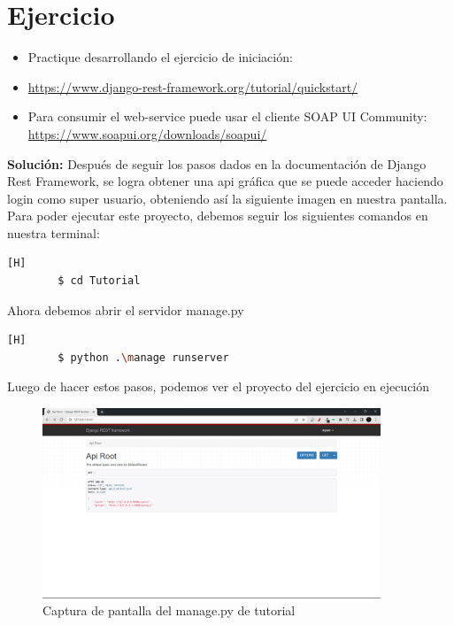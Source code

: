 \documentclass{article}
\begin{document}
\section{Ejercicio}
	\begin{itemize}		
		\item Practique desarrollando el ejercicio de iniciación:
		\item \url{https://www.django-rest-framework.org/tutorial/quickstart/}
		\item Para consumir el web-service puede usar el cliente SOAP UI Community: \url{https://www.soapui.org/downloads/soapui/}
	\end{itemize}

        \textbf{Solución:}
        Después de seguir los pasos dados en la documentación de Django Rest Framework, se logra obtener una api gráfica que se puede acceder haciendo login como super usuario, obteniendo así la siguiente imagen en nuestra pantalla. \\
        
        Para poder ejecutar este proyecto, debemos seguir los siguientes comandos en nuestra terminal:

        \begin{lstlisting}[language=bash,caption={Ingresango a la carpeta Tutorial}][H]
		$ cd Tutorial
	\end{lstlisting}

        Ahora debemos abrir el servidor manage.py
        
        \begin{lstlisting}[language=bash,caption={Abriendo el servidor del ejercicio}][H]
		$ python .\manage runserver
	\end{lstlisting}

        Luego de hacer estos pasos, podemos ver el proyecto del ejercicio en ejecución
        
        \begin{figure}[H]
            \centering
            \includegraphics[width=0.9\textwidth,keepaspectratio]{img/ejercicioMain.png}
            \caption{Captura de pantalla del manage.py de tutorial}
            \label{fig:enter-label}
        \end{figure}
        
\end{document}
